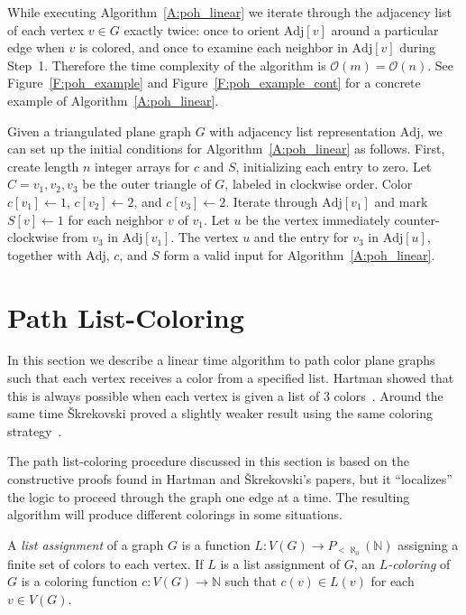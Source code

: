 \documentclass[12pt,letterpaper]{article}
\theoremstyle{plain}
\theoremstyle{definition}
\theoremstyle{break}
\newcommand{\defterm}[1]{\emph{#1}} %
\begin{document}
While executing Algorithm~\ref{A:poh_linear} we iterate through
the adjacency list of each vertex $v\in G$ exactly twice: once to
orient $\text{Adj}[v]$
around a particular edge when $v$ is colored,
and once to examine each neighbor in $\text{Adj}[v]$ during Step~1.
Therefore the time complexity of the algorithm is
$\mathcal{O}(m)=\mathcal{O}(n)$. See Figure~\ref{F:poh_example} 
and Figure~\ref{F:poh_example_cont} for a concrete example of
Algorithm~\ref{A:poh_linear}.

Given a triangulated plane graph $G$ with adjacency list representation
$\text{Adj}$, we can set up the initial conditions for
Algorithm~\ref{A:poh_linear} as follows. First, create length $n$ integer
arrays for $c$ and $S$, initializing each entry to zero.
Let $C=v_1,v_2,v_3$ be the outer triangle of $G$,
labeled in clockwise order.
Color $c[v_1]\leftarrow 1$, $c[v_2]\leftarrow 2$, and
$c[v_3]\leftarrow 2$.
Iterate through $\text{Adj}[v_1]$ and mark $S[v]\leftarrow 1$ for each
neighbor $v$ of $v_1$.
Let $u$ be the vertex immediately counter-clockwise from $v_3$ in
$\text{Adj}[v_1]$. The vertex $u$ and the entry for $v_3$ in $\text{Adj}[u]$,
together with $\text{Adj}$, $c$, and $S$ form a valid input for
Algorithm~\ref{A:poh_linear}.

\section{Path List-Coloring}

In this section we describe a linear time algorithm to path color
plane graphs such that each vertex receives a color from a specified list.
Hartman showed that this is always possible when each vertex is given a
list of $3$ colors~\cite[Thm.~4.1]{Har1997}. Around the same
time \v{S}krekovski proved a
slightly weaker result using the same coloring
strategy~\cite[Thm.~2.2b]{Skr1999}.

The path list-coloring procedure discussed in this section is
based on the constructive proofs found in Hartman and
\v{S}krekovski's papers, but it ``localizes'' the logic to proceed through the
graph one edge at a time. The resulting algorithm
will produce different colorings in some situations.

A \defterm{list assignment} of a graph $G$ is
a function $L:V(G)\to P_{<\aleph_0}(\mathbb{N})$ assigning
a finite set of colors to each vertex. If $L$ is a list assignment of $G$,
an \defterm{$L$-coloring} of $G$ is a coloring function
$c:V(G)\to\mathbb{N}$ such that $c(v)\in L(v)$ for each $v\in V(G)$.
\end{document}
